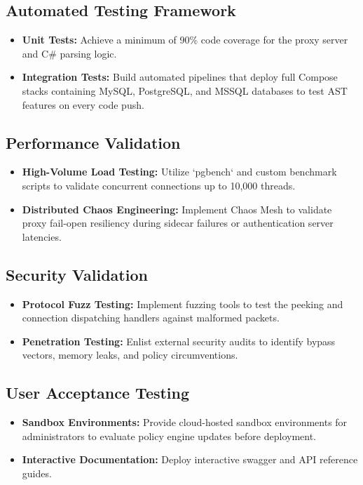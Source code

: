 \subsection{Automated Testing Framework}

\begin{itemize}
    \item \textbf{Unit Tests:} Achieve a minimum of 90\% code coverage for the proxy server and C\# parsing logic.
    \item \textbf{Integration Tests:} Build automated pipelines that deploy full Compose stacks containing MySQL, PostgreSQL, and MSSQL databases to test AST features on every code push.
\end{itemize}

\subsection{Performance Validation}

\begin{itemize}
    \item \textbf{High-Volume Load Testing:} Utilize `pgbench` and custom benchmark scripts to validate concurrent connections up to 10,000 threads.
    \item \textbf{Distributed Chaos Engineering:} Implement Chaos Mesh to validate proxy fail-open resiliency during sidecar failures or authentication server latencies.
\end{itemize}

\subsection{Security Validation}

\begin{itemize}
    \item \textbf{Protocol Fuzz Testing:} Implement fuzzing tools to test the peeking and connection dispatching handlers against malformed packets.
    \item \textbf{Penetration Testing:} Enlist external security audits to identify bypass vectors, memory leaks, and policy circumventions.
\end{itemize}

\subsection{User Acceptance Testing}

\begin{itemize}
    \item \textbf{Sandbox Environments:} Provide cloud-hosted sandbox environments for administrators to evaluate policy engine updates before deployment.
    \item \textbf{Interactive Documentation:} Deploy interactive swagger and API reference guides.
\end{itemize}

